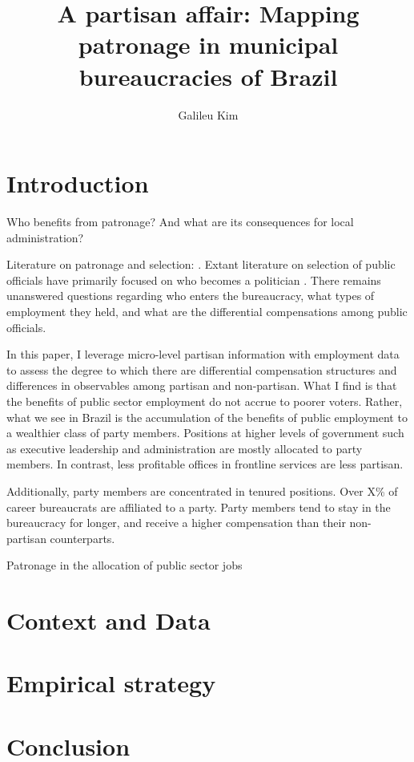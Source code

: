 \documentclass[12pt,a4paper]{article}
\title{A partisan affair: Mapping patronage in municipal bureaucracies of Brazil}
\author{Galileu Kim}
\affil{Princeton University}
\begin{document}
\maketitle


\newpage

\section{Introduction}
\label{sec:intro}

Who benefits from patronage? And what are its consequences for local administration? 

Literature on patronage and selection: \citet{robinson2013political}. Extant literature on selection of public officials have primarily focused on who becomes a politician \citet{dal2017becomes}. There remains unanswered questions regarding who enters the bureaucracy, what types of employment they held, and what are the differential compensations among public officials.

In this paper, I leverage micro-level partisan information with employment data to assess the degree to which there are differential compensation structures and differences in observables among partisan and non-partisan. What I find is that the benefits of public sector employment do not accrue to poorer voters. Rather, what we see in Brazil is the accumulation of the benefits of public employment to a wealthier class of party members. Positions at higher levels of government such as executive leadership and administration are mostly allocated to party members. In contrast, less profitable offices in frontline services are less partisan.

Additionally, party members are concentrated in tenured positions. Over X\% of career bureaucrats are affiliated to a party. Party members tend to stay in the bureaucracy for longer, and receive a higher compensation than their non-partisan counterparts. 

Patronage in the allocation of public sector jobs 

\section{Context and Data}
\label{sec:context}



\section{Empirical strategy}
\label{sec:empirical}

\section{Conclusion}
\label{sec:conclusion}

\newpage


\end{document}
